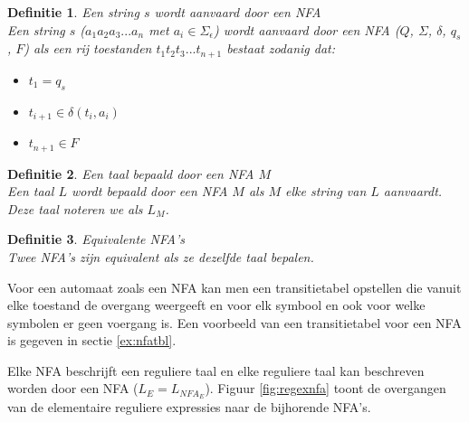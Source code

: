 \documentclass[a4paper]{article}
\newtheorem{tdefinitie}{Definitie}[section]
\newenvironment{definitie}[1]%
  {\begin{mdframed}[backgroundcolor=silver,
    topline=false,
    rightline=false,
    leftline=false,
    bottomline=false]\begin{tdefinitie}#1\\\normalfont}%
  {\end{tdefinitie}\end{mdframed}}
\begin{document}

\begin{definitie}{Een string $s$ wordt aanvaard door een NFA}
  Een string $s$ ($a_1a_2a_3...a_n$ met $a_i \in \Sigma_\epsilon$) wordt aanvaard door een NFA ($Q$, $\Sigma$, $\delta$, $q_s$, $F$) als een rij toestanden $t_1t_2t_3...t_{n+1}$ bestaat zodanig dat:
  \begin{itemize}
  \item $t_1 = q_s$
  \item $t_{i+1} \in \delta(t_i, a_i)$
  \item $t_{n+1} \in F$
  \end{itemize}
\end{definitie}

\begin{definitie}{Een taal bepaald door een NFA $M$}
  Een taal $L$ wordt bepaald door een NFA $M$ als $M$ elke string van $L$ aanvaardt. Deze taal noteren we als $L_M$.
\end{definitie}

\begin{definitie}{Equivalente NFA's}
  Twee NFA's zijn equivalent als ze dezelfde taal bepalen.
\end{definitie}

Voor een automaat zoals een NFA kan men een transitietabel opstellen die vanuit elke toestand de overgang weergeeft en voor elk symbool en ook voor welke symbolen er geen voergang is. Een voorbeeld van een transitietabel voor een NFA is gegeven in sectie \ref{ex:nfatbl}.

Elke NFA beschrijft een reguliere taal en elke reguliere taal kan beschreven worden door een NFA ($L_E = L_{NFA_E}$). Figuur \ref{fig:regexnfa} toont de overgangen van de elementaire reguliere expressies naar de bijhorende NFA's.
\end{document}
